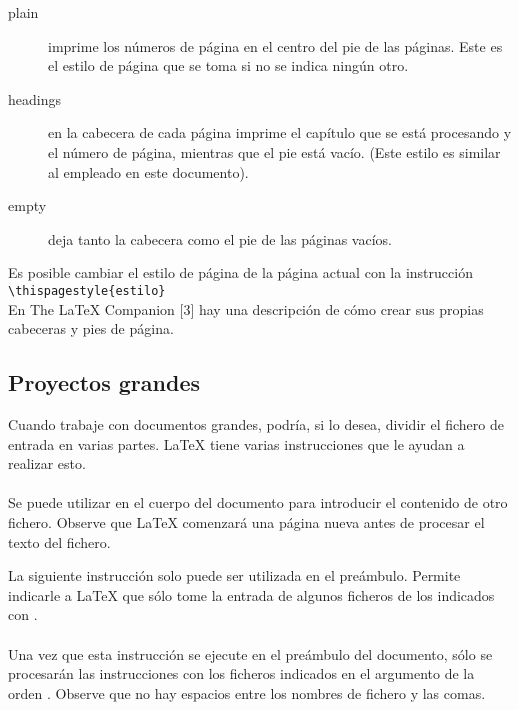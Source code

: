 \begin{table}[htbp]
\centering
	\hrulefill
	\begin{description}
	\item[plain] imprime los n\'umeros de p\'agina en el centro del pie de las p\'aginas. Este es el estilo de 
				p\'agina que se toma si no se indica ning\'un otro. 
	\item[headings] en la cabecera de cada p\'agina imprime el cap\'itulo que se est\'a procesando y el n\'umero de 
				p\'agina, mientras que el pie est\'a vac\'io. (Este estilo es similar al empleado en este documento). 
	\item[empty] deja tanto la cabecera como el pie de las p\'aginas vac\'ios.
	\end{description}
	\hrulefill
\caption{Estilos de p\'agina predefinidos en \LaTeX{}}
\label{tab:estilos}
\end{table}

				Es posible cambiar el estilo de p\'agina de la p\'agina actual con la instrucci\'on\\
							\verb+\thispagestyle{estilo}+\\
				En The \LaTeX{} Companion [3]               hay una descripci\'on de c\'omo crear sus propias cabeceras y 
				pies de p\'agina.
						 
		\subsection{Proyectos grandes}
		Cuando trabaje con documentos grandes, podr\'ia, si lo desea, dividir el fichero de entrada en varias partes. 
		\LaTeX{} tiene varias instrucciones que le ayudan a realizar esto.\\
				\verb++\\
		Se puede utilizar en el cuerpo del documento para introducir el contenido de otro fichero. Observe que 
		\LaTeX{} comenzar\'a una p\'agina nueva antes de procesar el texto del fichero.
		
		La siguiente instrucci\'on solo puede ser utilizada en el pre\'ambulo. Permite indicarle a \LaTeX{} que s\'olo tome 
		la entrada de algunos ficheros de los indicados con \verb++.\\
				\verb++\\
		Una vez que esta instrucci\'on se ejecute en el pre\'ambulo del documento, s\'olo se procesar\'an las 
		instrucciones \verb++ con los ficheros indicados en el argumento de la orden \verb++. Observe 
		que no hay espacios entre los nombres de fichero y las comas. 
		
